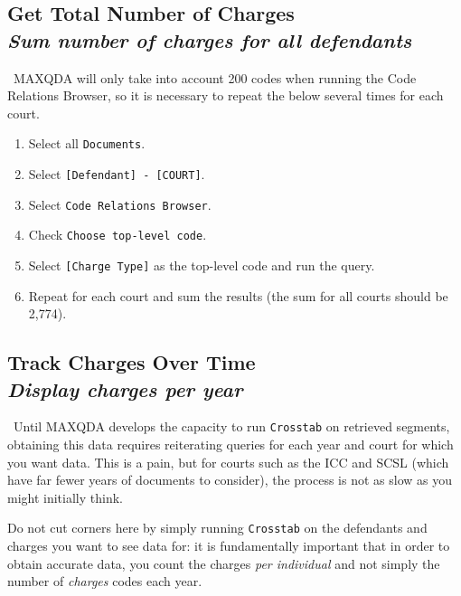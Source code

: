 \documentclass[usenames,dvipsnames]{article}
\newcommand{\code}[1]{\colorbox{light-gray}{\texttt{#1}}}
\newcommand{\command}[1]{\colorbox{light-red}{\texttt{#1}}}
\newcommand{\option}[1]{\colorbox{light-blue}{\texttt{#1}}}
\newcommand{\chargingdocs}[1]{\colorbox{light-yellow}{\texttt{#1}}}
\newcommand{\note}[1]{\textit{\textbf{Note:} }}
\begin{document}
\subsection{Get Total Number of Charges \\ \textit{Sum number of charges for all defendants}}
\note ~MAXQDA will only take into account 200 codes when running the Code Relations Browser, so it is necessary to repeat the below several times for each court.

\begin{enumerate}
	\item Select all \chargingdocs{Documents}.
	\item Select \code{[Defendant] - [COURT]}.
	\item Select \command{Code Relations Browser}.
	\item Check \option{Choose top-level code}.
	\item Select \code{[Charge Type]} as the top-level code and run the query.
	\item Repeat for each court and sum the results (the sum for all courts should be 2,774).
\end{enumerate}

\subsection{Track Charges Over Time \\ \textit{Display charges per year}}
\note ~Until MAXQDA develops the capacity to run \command{Crosstab} on retrieved segments, obtaining this data requires reiterating queries for each year and court for which you want data. This is a pain, but for courts such as the ICC and SCSL (which have far fewer years of documents to consider), the process is not as slow as you might initially think.

Do not cut corners here by simply running \command{Crosstab} on the defendants and charges you want to see data for: it is fundamentally important that in order to obtain accurate data, you count the charges \textit{per individual} and not simply the number of \textit{charges} codes each year. 
\end{document}
